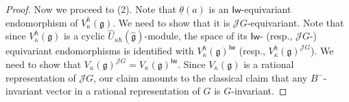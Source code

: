 \documentclass{amsart}
\theoremstyle{definition}
\newcommand{\on}{\mathrm}
\newcommand{\g}{\mathfrak{g}}
\newcommand{\hg}{\hat{\mathfrak{g}}}
\newcommand{\h}{\mathfrak{h}}
\newcommand{\hh}{\hat{\mathfrak{h}}}
\newcommand{\ffr}{\mathrm{ffr}}
\newcommand{\Wak}{\on{Wak}}
\newcommand{\A}{\mathscr{A}}
\newcommand{\Jet}{\mathscr{J}}
\newcommand{\Loop}{\mathscr{L}}
\newcommand{\CDO}{\mathrm{CDO}}
\newcommand{\Iw}{\mathsf{Iw}}
\numberwithin{equation}{section}
\begin{document}
\begin{proof}


Now we proceed to (2). Note that $\underline{\theta}(a)$ is an $\Iw$-equivariant endomorphism of $V^\hbar_\kappa(\g)$. We need to show that it is $\Jet G$-equivariant. Note that since $V^\hbar_\kappa(\g)$ is a cyclic 
$\widehat{U}_{\kappa\hbar}(\hg)$-module, the space of its $\Iw$- (resp., $\Jet G$-) equivariant endomorphisms is identified with 
$V^\hbar_\kappa(\g)^{\Iw}$ (resp., $V^\hbar_\kappa(\g)^{\Jet G}$). We need to show that $V_\kappa(\g)^{\Jet G}=V_\kappa(\g)^{\Iw}$. Since $V_\kappa(\g)$ is a rational representation of $\Jet G$, our claim amounts to the classical claim that any $B^-$-invariant vector in a rational representation of $G$ is $G$-invariant.
\end{proof}
\end{document}
